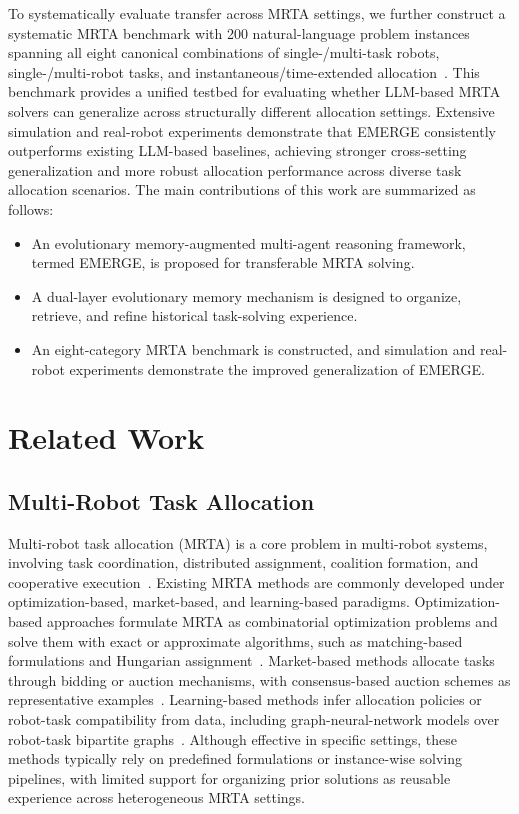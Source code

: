 \documentclass[letterpaper,journal]{IEEEtran}
\begin{document}
To systematically evaluate transfer across MRTA settings, we further construct a systematic MRTA benchmark with 200 natural-language problem instances spanning all eight canonical combinations of single-/multi-task robots, single-/multi-robot tasks, and instantaneous/time-extended allocation~\cite{korsah2013comprehensive}. This benchmark provides a unified testbed for evaluating whether LLM-based MRTA solvers can generalize across structurally different allocation settings. Extensive simulation and real-robot experiments demonstrate that EMERGE consistently outperforms existing LLM-based baselines, achieving stronger cross-setting generalization and more robust allocation performance across diverse task allocation scenarios.
The main contributions of this work are summarized as follows:
\begin{itemize}
    \item An evolutionary memory-augmented multi-agent reasoning framework, termed EMERGE, is proposed for transferable MRTA solving.
    \item A dual-layer evolutionary memory mechanism is designed to organize, retrieve, and refine historical task-solving experience.
    \item An eight-category MRTA benchmark is constructed, and simulation and real-robot experiments demonstrate the improved generalization of EMERGE.
\end{itemize}



\section{Related Work}

\subsection{Multi-Robot Task Allocation}
Multi-robot task allocation (MRTA) is a core problem in multi-robot systems, involving task coordination, distributed assignment, coalition formation, and cooperative execution~\cite{aziz2022task,antonyshyn2023multiple,faigl2012goal}. Existing MRTA methods are commonly developed under optimization-based, market-based, and learning-based paradigms. Optimization-based approaches formulate MRTA as combinatorial optimization problems and solve them with exact or approximate algorithms, such as matching-based formulations and Hungarian assignment~\cite{sung2020distributed}. Market-based methods allocate tasks through bidding or auction mechanisms, with consensus-based auction schemes as representative examples~\cite{lusk2020distributed,choi2009consensus}. Learning-based methods infer allocation policies or robot-task compatibility from data, including graph-neural-network models over robot-task bipartite graphs~\cite{liu2024glan}. Although effective in specific settings, these methods typically rely on predefined formulations or instance-wise solving pipelines, with limited support for organizing prior solutions as reusable experience across heterogeneous MRTA settings.
\end{document}
